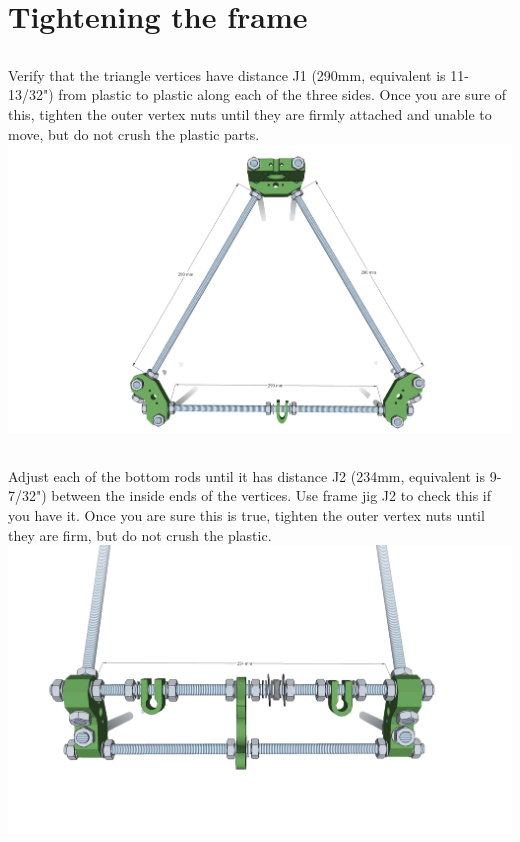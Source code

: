 \documentclass[twoside,openany,a4paper,titlepage]{memoir}
\begin{document}
	\chapter{Tightening the frame}
	
	\section{}
	Verify that the triangle vertices have distance J1 (290mm, equivalent is 11-13/32") from plastic to plastic
	along each of the three sides. Once you are sure of this, tighten the outer vertex nuts until they are
	firmly attached and unable to move, but do not crush the plastic parts.\\
	\includegraphics[width=1\linewidth]{graphics/ch5_1.png}
	
	\section{}
	Adjust each of the bottom rods until it has distance J2 (234mm, equivalent is 9-7/32") between the
	inside ends of the vertices. Use frame jig J2 to check this if you have it. Once you are sure this is true,
	tighten the outer vertex nuts until they are firm, but do not crush the plastic.\\
	\includegraphics[width=1\linewidth]{graphics/ch5_2.png}
	
\end{document}
